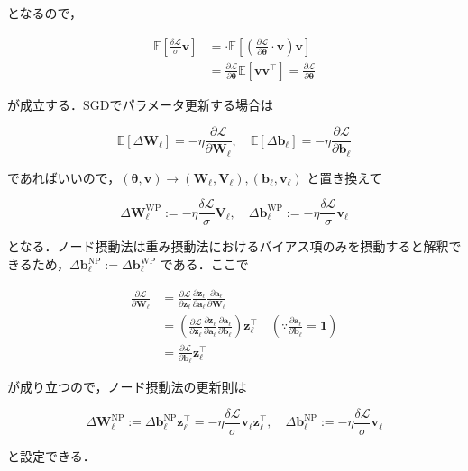 \documentclass[11pt,a4paper]{jsarticle}
\begin{document}
となるので，

\begin{align}
\mathbb{E}\left[\frac{\delta \mathcal{L}}{\sigma}\mathbf{v}\right] &=
\cdot \mathbb{E}\left[\left(\frac{\partial \mathcal{L}}{\partial \boldsymbol{\theta}}\cdot \mathbf{v}\right)\mathbf{v}\right]\\
&=\frac{\partial \mathcal{L}}{\partial \boldsymbol{\theta}} \mathbb{E}[\mathbf{v} \mathbf{v}^\top]=\frac{\partial \mathcal{L}}{\partial \boldsymbol{\theta}}
\end{align}

が成立する．SGDでパラメータ更新する場合は

\begin{equation}
\mathbb{E}[\Delta \mathbf{W}_\ell]=-\eta \dfrac{\partial \mathcal{L}}{\partial \mathbf{W}_\ell},\quad \mathbb{E}[\Delta \mathbf{b}_\ell]=-\eta \dfrac{\partial \mathcal{L}}{\partial \mathbf{b}_\ell}
\end{equation}

であればいいので，$(\boldsymbol{\theta}, \mathbf{v}) \to (\mathbf{W}_\ell, \mathbf{V}_\ell), (\mathbf{b}_\ell, \mathbf{v}_\ell)$ と置き換えて

\begin{equation}
\Delta \mathbf{W}_\ell^{\mathrm{WP}}:=-\eta \frac{\delta \mathcal{L}}{\sigma}\mathbf{V}_\ell,\quad \Delta \mathbf{b}_\ell^{\mathrm{WP}}:=-\eta \frac{\delta \mathcal{L}}{\sigma}\mathbf{v}_\ell
\end{equation}

となる．ノード摂動法は重み摂動法におけるバイアス項のみを摂動すると解釈できるため，$\Delta \mathbf{b}_\ell^{\mathrm{NP}}:=\Delta \mathbf{b}_\ell^{\mathrm{WP}}$ である．ここで

\begin{align}
\frac{\partial \mathcal{L}}{\partial \mathbf{W}_\ell}&=\frac{\partial \mathcal{L}}{\partial \mathbf{z}_\ell} \frac{\partial \mathbf{z}_\ell}{\partial \mathbf{a}_\ell} \frac{\partial \mathbf{a}_\ell}{\partial \mathbf{W}_\ell}\\
&=\left(\frac{\partial \mathcal{L}}{\partial \mathbf{z}_\ell} \frac{\partial \mathbf{z}_\ell}{\partial \mathbf{a}_\ell}\frac{\partial \mathbf{a}_\ell}{\partial \mathbf{b}_\ell}\right) \mathbf{z}_\ell^\top\quad \left(\because \frac{\partial \mathbf{a}_\ell}{\partial \mathbf{b}_\ell}=\mathbf{1}\right)\\
&=\frac{\partial \mathcal{L}}{\partial \mathbf{b}_\ell}\mathbf{z}_\ell^\top
\end{align}

が成り立つので，ノード摂動法の更新則は

\begin{equation}
\Delta \mathbf{W}_\ell^{\mathrm{NP}}:=\Delta \mathbf{b}_\ell^{\mathrm{NP}}\mathbf{z}_\ell^\top=-\eta \frac{\delta \mathcal{L}}{\sigma}\mathbf{v}_\ell\mathbf{z}_\ell^\top,\quad \Delta \mathbf{b}_\ell^{\mathrm{NP}}:=-\eta \frac{\delta \mathcal{L}}{\sigma}\mathbf{v}_\ell
\end{equation}

と設定できる．
\end{document}
